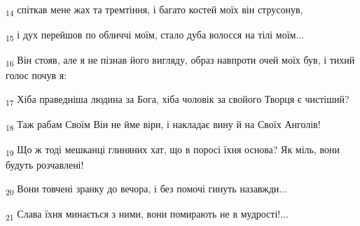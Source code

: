 \begin{tcolorbox}
\textsubscript{14} спіткав мене жах та тремтіння, і багато костей моїх він струсонув,
\end{tcolorbox}
\begin{tcolorbox}
\textsubscript{15} і дух перейшов по обличчі моїм, стало дуба волосся на тілі моїм...
\end{tcolorbox}
\begin{tcolorbox}
\textsubscript{16} Він стояв, але я не пізнав його вигляду, образ навпроти очей моїх був, і тихий голос почув я:
\end{tcolorbox}
\begin{tcolorbox}
\textsubscript{17} Хіба праведніша людина за Бога, хіба чоловік за свойого Творця є чистіший?
\end{tcolorbox}
\begin{tcolorbox}
\textsubscript{18} Таж рабам Своїм Він не йме віри, і накладає вину й на Своїх Анголів!
\end{tcolorbox}
\begin{tcolorbox}
\textsubscript{19} Що ж тоді мешканці глиняних хат, що в поросі їхня основа? Як міль, вони будуть розчавлені!
\end{tcolorbox}
\begin{tcolorbox}
\textsubscript{20} Вони товчені зранку до вечора, і без помочі гинуть назавжди...
\end{tcolorbox}
\begin{tcolorbox}
\textsubscript{21} Слава їхня минається з ними, вони помирають не в мудрості!...
\end{tcolorbox}
